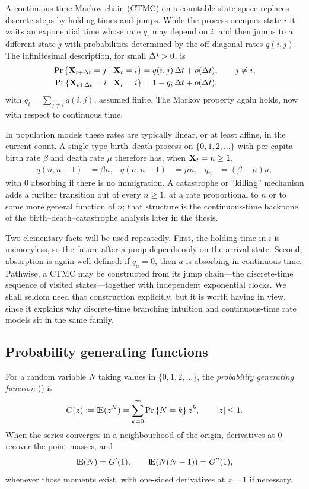 A continuous-time Markov chain (CTMC) on a countable state space replaces discrete steps by holding times and jumps. While the process occupies state $i$ it waits an exponential time whose rate $q_i$ may depend on $i$, and then jumps to a different state $j$ with probabilities determined by the off-diagonal rates $q(i,j)$. The infinitesimal description, for small $\Delta t>0$, is
\begin{align*}
{\text{Pr}\left\{{\bf X}_{t+\Delta t}=j \mid {\bf X}_t=i\right\}}
&=
q(i,j)\,\Delta t + o(\Delta t),
\qquad
j\neq i,
\\
{\text{Pr}\left\{{\bf X}_{t+\Delta t}=i \mid {\bf X}_t=i\right\}}
&=
1 - q_i\,\Delta t + o(\Delta t),
\end{align*}
with $q_i=\sum_{j\neq i} q(i,j)$, assumed finite. The Markov property again holds, now with respect to continuous time.

In population models these rates are typically linear, or at least affine, in the current count. A single-type birth--death process on $\{0,1,2,\ldots\}$ with per capita birth rate $\beta$ and death rate $\mu$ therefore has, when ${\bf X}_t=n\geq 1$,
\begin{align*}
q(n,n+1) &= \beta n,
&
q(n,n-1) &= \mu n,
&
q_n &= (\beta+\mu)n,
\end{align*}
with $0$ absorbing if there is no immigration. A catastrophe or ``killing'' mechanism adds a further transition out of every $n\geq 1$, at a rate proportional to $n$ or to some more general function of $n$; that structure is the continuous-time backbone of the birth--death--catastrophe analysis later in the thesis.

Two elementary facts will be used repeatedly. First, the holding time in $i$ is memoryless, so the future after a jump depends only on the arrival state. Second, absorption is again well defined: if $q_a=0$, then $a$ is absorbing in continuous time. Pathwise, a CTMC may be constructed from its jump chain---the discrete-time sequence of visited states---together with independent exponential clocks. We shall seldom need that construction explicitly, but it is worth having in view, since it explains why discrete-time branching intuition and continuous-time rate models sit in the same family.

\subsection{Probability generating functions}
\label{sec:pgf}

For a random variable $N$ taking values in $\{0,1,2,\ldots\}$, the \emph{probability generating function} (\pgf) is
\[
G(z)
:=
{\rm I}\!{\rm E}(z^{N})
=
\sum_{k=0}^{\infty} {\text{Pr}\left\{N=k\right\}}\, z^{k},
\qquad
|z|\leq 1.
\]
When the series converges in a neighbourhood of the origin, derivatives at $0$ recover the point masses, and
\[
{\rm I}\!{\rm E}(N) = G'(1),
\qquad
{\rm I}\!{\rm E}(N(N-1)) = G''(1),
\]
whenever those moments exist, with one-sided derivatives at $z=1$ if necessary.

